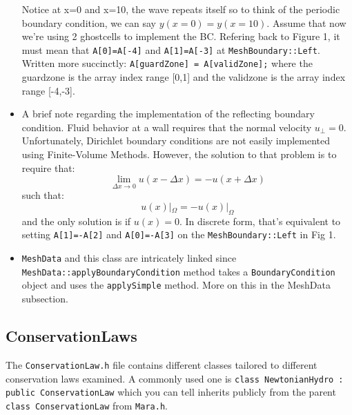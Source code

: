\documentclass{article}
\begin{document}
\begin{itemize}
	Notice at x=0 and x=10, the wave repeats itself so to think of the periodic boundary condition, we can say $y(x=0)=y(x=10)$. Assume that now we're using 2 ghostcells to implement the BC. Refering back to Figure 1, it must mean that \texttt{A[0]=A[-4]} and \texttt{A[1]=A[-3]} at \texttt{MeshBoundary::Left}. Written more succinctly: \texttt{A[guardZone] = A[validZone];} where the guardzone is the array index range [0,1] and the validzone is the array index range [-4,-3]. 
	
	\item A brief note regarding the implementation of the reflecting boundary condition. Fluid behavior at a wall requires that the normal velocity $u_\perp=0$. Unfortunately, Dirichlet boundary conditions are not easily implemented using Finite-Volume Methods. However, the solution to that problem is to require that:
	$$\lim_{\Delta x \rightarrow 0}u(x-\Delta x) = -u(x + \Delta x) $$
	such that: 
	$$ u(x)|_{\Omega} = -u(x)|_{\Omega}$$ and the only solution is if $u(x) = 0$. In discrete form, that's equivalent to setting \texttt{A[1]=-A[2]} and \texttt{A[0]=-A[3]} on the \texttt{MeshBoundary::Left} in Fig 1.
		
	\item \texttt{MeshData} and this class are intricately linked since \texttt{MeshData::applyBoundaryCondition} method takes a \texttt{BoundaryCondition} object and uses the \texttt{applySimple} method. More on this in the MeshData subsection.
	
	
\end{itemize}

\subsection{ConservationLaws}
The \texttt{ConservationLaw.h} file contains different classes tailored to different conservation laws examined. A commonly used one is \texttt{class NewtonianHydro : public ConservationLaw} which you can tell inherits publicly from the parent \texttt{class ConservationLaw} from \texttt{Mara.h}. 
\end{document}

